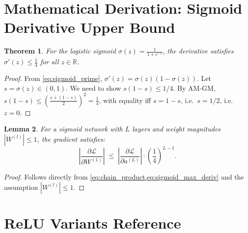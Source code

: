\documentclass[12pt,a4paper]{article}
\newtheorem{theorem}{Theorem}[section]
\newtheorem{lemma}[theorem]{Lemma}
\newcommand{\sigmoid}{\sigma}
\newcommand{\Loss}{\mathcal{L}}
\begin{document}
\appendix

\section{Mathematical Derivation: Sigmoid Derivative Upper Bound}
\label{app:sigmoid_bound}

\begin{theorem}
\label{thm:sigmoid_bound}
For the logistic sigmoid $\sigmoid(z) = \frac{1}{1+e^{-z}}$, the
derivative satisfies $\sigmoid'(z) \leq \frac{1}{4}$ for all
$z \in \mathbb{R}$.
\end{theorem}

\begin{proof}
From \cref{eq:sigmoid_prime}, $\sigmoid'(z) = \sigmoid(z)(1-\sigmoid(z))$.
Let $s = \sigmoid(z) \in (0,1)$.  We need to show $s(1-s) \leq 1/4$.
By AM-GM, $s(1-s) \leq \left(\frac{s + (1-s)}{2}\right)^2 = \frac{1}{4}$,
with equality iff $s = 1-s$, i.e.\ $s = 1/2$, i.e.\ $z = 0$.
\end{proof}

\begin{lemma}
\label{lem:product_decay}
For a sigmoid network with $L$ layers and weight magnitudes
$|W^{(l)}| \leq 1$, the gradient satisfies:
\begin{equation}
  \left|\frac{\partial\Loss}{\partial W^{(1)}}\right|
  \;\leq\;
  \left|\frac{\partial\Loss}{\partial a^{(L)}}\right|
  \cdot \left(\frac{1}{4}\right)^{L-1}.
  \label{eq:decay_bound}
\end{equation}
\end{lemma}

\begin{proof}
Follows directly from \cref{eq:chain_product,eq:sigmoid_max_deriv}
and the assumption $|W^{(l)}| \leq 1$.
\end{proof}

\section{ReLU Variants Reference}
\label{app:relu_variants}
\end{document}
